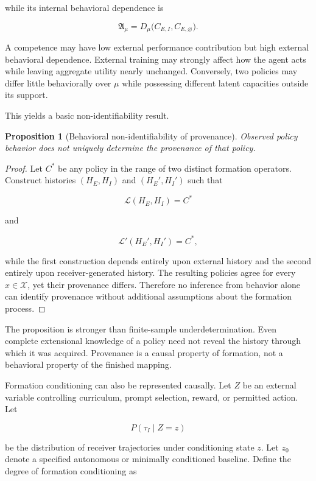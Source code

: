 \documentclass[11pt]{article}
\newtheorem{proposition}{Proposition}[section]
\begin{document}
while its internal behavioral dependence is

\[
\mathfrak{A}_{\mu}
=
D_{\mu}
\bigl(
C_{E,I},
C_{E,\varnothing}
\bigr).
\]

A competence may have low external performance contribution but high external behavioral dependence. External training may strongly affect how the agent acts while leaving aggregate utility nearly unchanged. Conversely, two policies may differ little behaviorally over $\mu$ while possessing different latent capacities outside its support.

This yields a basic non-identifiability result.

\begin{proposition}[Behavioral non-identifiability of provenance]
Observed policy behavior does not uniquely determine the provenance of that policy.
\end{proposition}

\begin{proof}
Let $C^{*}$ be any policy in the range of two distinct formation operators. Construct histories $(H_E,H_I)$ and $(H_E',H_I')$ such that

\[
\mathcal{L}(H_E,H_I)=C^{*}
\]

and

\[
\mathcal{L}'(H_E',H_I')=C^{*},
\]

while the first construction depends entirely upon external history and the second entirely upon receiver-generated history. The resulting policies agree for every $x\in\mathcal{X}$, yet their provenance differs. Therefore no inference from behavior alone can identify provenance without additional assumptions about the formation process.
\end{proof}

The proposition is stronger than finite-sample underdetermination. Even complete extensional knowledge of a policy need not reveal the history through which it was acquired. Provenance is a causal property of formation, not a behavioral property of the finished mapping.

Formation conditioning can also be represented causally. Let $Z$ be an external variable controlling curriculum, prompt selection, reward, or permitted action. Let

\[
P(\tau_I\mid Z=z)
\]

be the distribution of receiver trajectories under conditioning state $z$. Let $z_0$ denote a specified autonomous or minimally conditioned baseline. Define the degree of formation conditioning as
\end{document}
